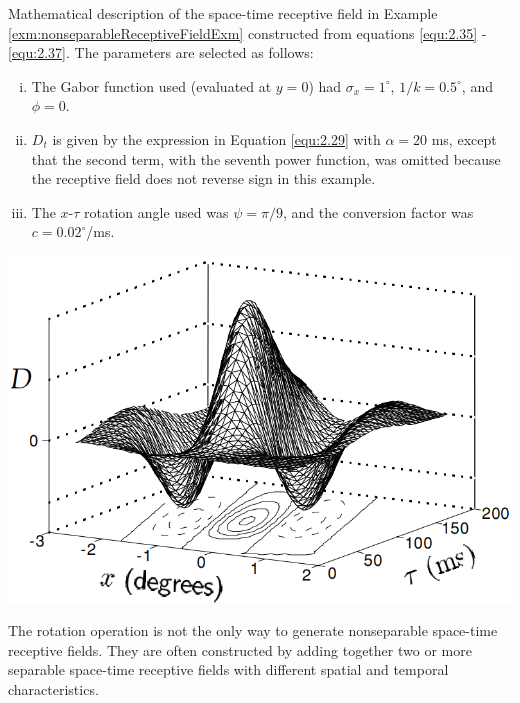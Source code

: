 \begin{exm}
  \label{exm:nonseparableReceptiveFieldEst1}
  Mathematical description of the space-time receptive field in Example \ref{exm:nonseparableReceptiveFieldExm} constructed from equations \ref{equ:2.35} - \ref{equ:2.37}. The parameters are selected as follows:
  \begin{enumerate}[(i)]
  \item The Gabor function used (evaluated at $y = 0$) had $\sigma_x = 1^{\circ}$, $1/k = 0.5^{\circ}$, and $\phi = 0$.
  \item $D_t$ is given by the expression in Equation \ref{equ:2.29} with $\alpha = 20$ ms, except that the second term, with the seventh power function, was omitted because the receptive field does not reverse sign in this example.
  \item The $x$-$\tau$ rotation angle used was $\psi = \pi/9$, and the conversion factor was $c = 0.02^{\circ}$/ms.
  \end{enumerate}
  \begin{center}
    \includegraphics[scale=0.25]{./png/nonseparableReceptiveFieldEst1}
  \end{center}
\end{exm}

\begin{rem}
  The rotation operation is not the only way to generate nonseparable space-time receptive fields. They are often constructed by adding together two or more separable space-time receptive fields with different spatial and temporal characteristics.
\end{rem}

